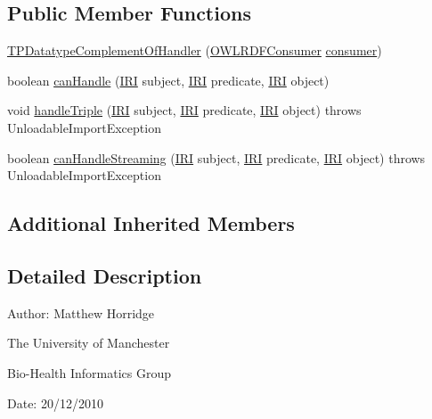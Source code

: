 \subsection*{Public Member Functions}
\begin{DoxyCompactItemize}
\item 
\hyperlink{classorg_1_1coode_1_1owlapi_1_1rdfxml_1_1parser_1_1_t_p_datatype_complement_of_handler_a3a9c8a8a64dba87730aab5f919eb676d}{T\-P\-Datatype\-Complement\-Of\-Handler} (\hyperlink{classorg_1_1coode_1_1owlapi_1_1rdfxml_1_1parser_1_1_o_w_l_r_d_f_consumer}{O\-W\-L\-R\-D\-F\-Consumer} \hyperlink{classorg_1_1coode_1_1owlapi_1_1rdfxml_1_1parser_1_1_abstract_triple_handler_a4ccf4d898ff01eb1cadfa04b23d54e9c}{consumer})
\item 
boolean \hyperlink{classorg_1_1coode_1_1owlapi_1_1rdfxml_1_1parser_1_1_t_p_datatype_complement_of_handler_a6a9ccfed3602906c10112e1423814ebb}{can\-Handle} (\hyperlink{classorg_1_1semanticweb_1_1owlapi_1_1model_1_1_i_r_i}{I\-R\-I} subject, \hyperlink{classorg_1_1semanticweb_1_1owlapi_1_1model_1_1_i_r_i}{I\-R\-I} predicate, \hyperlink{classorg_1_1semanticweb_1_1owlapi_1_1model_1_1_i_r_i}{I\-R\-I} object)
\item 
void \hyperlink{classorg_1_1coode_1_1owlapi_1_1rdfxml_1_1parser_1_1_t_p_datatype_complement_of_handler_aab4bf735a28f194568a2396df4002682}{handle\-Triple} (\hyperlink{classorg_1_1semanticweb_1_1owlapi_1_1model_1_1_i_r_i}{I\-R\-I} subject, \hyperlink{classorg_1_1semanticweb_1_1owlapi_1_1model_1_1_i_r_i}{I\-R\-I} predicate, \hyperlink{classorg_1_1semanticweb_1_1owlapi_1_1model_1_1_i_r_i}{I\-R\-I} object)  throws Unloadable\-Import\-Exception 
\item 
boolean \hyperlink{classorg_1_1coode_1_1owlapi_1_1rdfxml_1_1parser_1_1_t_p_datatype_complement_of_handler_a5d1bd5f461fb9b74dd3feaf567d3c444}{can\-Handle\-Streaming} (\hyperlink{classorg_1_1semanticweb_1_1owlapi_1_1model_1_1_i_r_i}{I\-R\-I} subject, \hyperlink{classorg_1_1semanticweb_1_1owlapi_1_1model_1_1_i_r_i}{I\-R\-I} predicate, \hyperlink{classorg_1_1semanticweb_1_1owlapi_1_1model_1_1_i_r_i}{I\-R\-I} object)  throws Unloadable\-Import\-Exception 
\end{DoxyCompactItemize}
\subsection*{Additional Inherited Members}


\subsection{Detailed Description}
Author\-: Matthew Horridge\par
 The University of Manchester\par
 Bio-\/\-Health Informatics Group\par
 Date\-: 20/12/2010 

